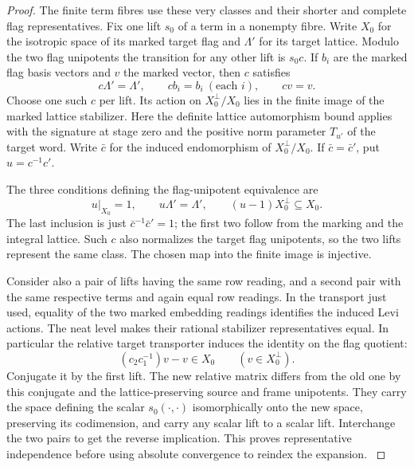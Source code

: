 \begin{proof}
The finite
term fibres use these very classes and their shorter
and complete flag representatives. Fix one lift \(s_0\) of a term in a nonempty fibre. Write
\(X_0\) for the isotropic space of its marked target flag and
\(\Lambda'\) for its target lattice. Modulo the two flag unipotents the transition for any other lift is \(s_0 c\). If \(b_i\) are the marked flag basis vectors and \(v\) the marked vector, then \(c\) satisfies
\[
 c\Lambda'=\Lambda',\qquad c b_i=b_i\ (\text{each }i),\qquad c v=v .
\] Choose one such \(c\) per lift. Its
action on \(X_0^\perp/X_0\) lies in the finite image of the marked
lattice stabilizer. Here the definite lattice automorphism bound
applies with the signature at stage zero and the positive norm
parameter \(T_{u'}\) of the target word. Write \(\bar c\) for the induced endomorphism of
\(X_0^\perp/X_0\). If \(\bar c=\bar c'\), put \(u=c^{-1}c'\).

The three conditions defining the flag-unipotent equivalence are
\[
 u|_{X_0}=1,\qquad u\Lambda'=\Lambda',\qquad
 (u-1)X_0^\perp\subseteq X_0 .
\]
The last inclusion is just \(\bar c^{-1}\bar c'=1\); the first
two follow from the marking and the integral lattice. Such \(c\) also normalizes
the target flag unipotents, so the two lifts represent the same
class. The chosen map into the finite image is injective.

Consider also a pair of lifts having the same row reading, and a
second pair with the same respective terms and again equal row
readings. In the transport just used, equality of the two marked
embedding readings identifies the induced Levi actions. The neat
level makes their rational stabilizer representatives equal. In particular the relative target transporter induces the identity on the flag quotient:
\[
 (c_2c_1^{-1})v-v\in X_0\qquad(v\in X_0^\perp).
\] Conjugate it by the first lift. The new relative
matrix differs from the old one by this conjugate and the
lattice-preserving source and frame unipotents. They carry the
space defining the scalar \(s_0(\cdot,\cdot)\) isomorphically
onto the new space, preserving its codimension, and carry any
scalar lift to a scalar lift. Interchange the two pairs to get
the reverse implication. This proves representative independence
before using absolute convergence to reindex the expansion.
\cite{companion-row-count}\label{cor:real-row-realization-3}
\end{proof}

